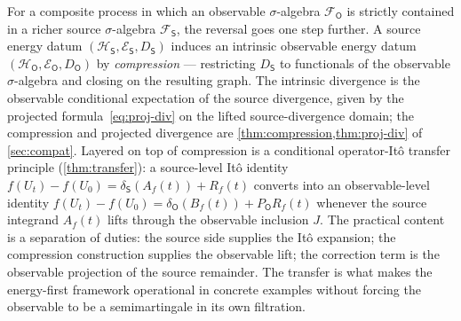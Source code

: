 \documentclass[11pt,reqno]{amsart}
\theoremstyle{plain}
\theoremstyle{definition}
\theoremstyle{remark}
\newcommand{\Hilb}{\mathcal{H}}
\newcommand{\Energy}{\mathcal{E}}
\newcommand{\Source}{\mathsf{S}}
\newcommand{\Obs}{\mathsf{O}}
\begin{document}
For a composite process in which an observable $\sigma$-algebra
$\mathcal F_\Obs$ is strictly contained in a richer source
$\sigma$-algebra $\mathcal F_\Source$, the reversal goes one step
further. A source energy datum
$(\Hilb_\Source,\Energy_\Source,D_\Source)$ induces an intrinsic
observable energy datum $(\Hilb_\Obs,\Energy_\Obs,D_\Obs)$ by
\emph{compression} --- restricting $D_\Source$ to functionals of the
observable $\sigma$-algebra and closing on the resulting graph. The
intrinsic divergence is the observable conditional expectation of the
source divergence, given by the projected
formula~\eqref{eq:proj-div} on the lifted source-divergence
domain; the compression and projected divergence are
\cref{thm:compression,thm:proj-div} of \cref{sec:compat}. Layered on
top of compression is a conditional operator-It\^o transfer
principle (\cref{thm:transfer}): a source-level It\^o identity
$f(U_{t})-f(U_{0})=\delta_\Source(A_{f}(t))+R_{f}(t)$ converts into
an observable-level identity
$f(U_{t})-f(U_{0})=\delta_\Obs(B_{f}(t))+P_\Obs R_{f}(t)$ whenever
the source integrand $A_{f}(t)$ lifts through the observable
inclusion $J$. The practical content is a separation of duties: the
source side supplies the It\^o expansion; the compression
construction supplies the observable lift; the correction term is
the observable projection of the source remainder. The transfer is
what makes the energy-first framework operational in concrete
examples without forcing the observable to be a semimartingale in
its own filtration.
\end{document}
